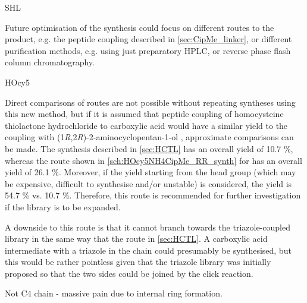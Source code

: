 SHL

Future optimisation of the synthesis could focus on different routes to the product, e.g. the peptide coupling described in \ref{sec:CipMe_linker}, or different purification methods, e.g. using just preparatory HPLC, or reverse phase flash column chromatography.

HOcy5

Direct comparisons of routes are not possible without repeating syntheses using this new method, but if it is assumed that peptide coupling of homocysteine thiolactone hydrochloride  to carboxylic acid  would have a similar yield to the coupling with (1\textit{R},2\textit{R})-2-aminocyclopentan-1-ol , approximate comparisons can be made.
The synthesis described in \ref{sec:HCTL} has an overall yield of 10.7 \%, whereas the route shown in \ref{sch:HOcy5NH4CipMe_RR_synth} for  has an overall yield of 26.1 \%. Moreover, if the yield starting from the head group (which may be expensive, difficult to synthesise and/or unstable) is considered, the yield is 54.7 \% vs. 10.7 \%.
Therefore, this route is recommended for further investigation if the library is to be expanded.

A downside to this route is that it cannot branch towards the triazole-coupled library in the same way that the route in \ref{sec:HCTL}. A carboxylic acid intermediate with a triazole in the chain could presumably be synthesised, but this would be rather pointless given that the triazole library was initially proposed so that the two sides could be joined by the click reaction.


Not C4 chain - massive pain due to internal ring formation.

